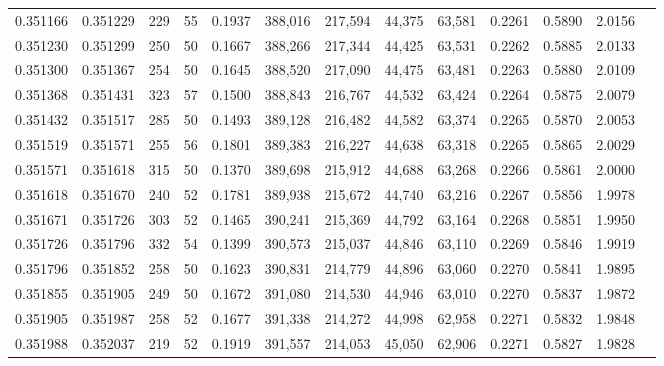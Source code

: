 \begin{tabular}{rrrrrrrrrrrrr}
0.351166 & 0.351229 &   229 &  55 &                                     0.1937 & 388,016 & 217,594 &  44,375 &  63,581 & 0.2261 & 0.5890 & 2.0156 \\
0.351230 & 0.351299 &   250 &  50 &                                     0.1667 & 388,266 & 217,344 &  44,425 &  63,531 & 0.2262 & 0.5885 & 2.0133 \\
0.351300 & 0.351367 &   254 &  50 &                                     0.1645 & 388,520 & 217,090 &  44,475 &  63,481 & 0.2263 & 0.5880 & 2.0109 \\
0.351368 & 0.351431 &   323 &  57 &                                     0.1500 & 388,843 & 216,767 &  44,532 &  63,424 & 0.2264 & 0.5875 & 2.0079 \\
0.351432 & 0.351517 &   285 &  50 &                                     0.1493 & 389,128 & 216,482 &  44,582 &  63,374 & 0.2265 & 0.5870 & 2.0053 \\
0.351519 & 0.351571 &   255 &  56 &                                     0.1801 & 389,383 & 216,227 &  44,638 &  63,318 & 0.2265 & 0.5865 & 2.0029 \\
0.351571 & 0.351618 &   315 &  50 &                                     0.1370 & 389,698 & 215,912 &  44,688 &  63,268 & 0.2266 & 0.5861 & 2.0000 \\
0.351618 & 0.351670 &   240 &  52 &                                     0.1781 & 389,938 & 215,672 &  44,740 &  63,216 & 0.2267 & 0.5856 & 1.9978 \\
0.351671 & 0.351726 &   303 &  52 &                                     0.1465 & 390,241 & 215,369 &  44,792 &  63,164 & 0.2268 & 0.5851 & 1.9950 \\
0.351726 & 0.351796 &   332 &  54 &                                     0.1399 & 390,573 & 215,037 &  44,846 &  63,110 & 0.2269 & 0.5846 & 1.9919 \\
0.351796 & 0.351852 &   258 &  50 &                                     0.1623 & 390,831 & 214,779 &  44,896 &  63,060 & 0.2270 & 0.5841 & 1.9895 \\
0.351855 & 0.351905 &   249 &  50 &                                     0.1672 & 391,080 & 214,530 &  44,946 &  63,010 & 0.2270 & 0.5837 & 1.9872 \\
0.351905 & 0.351987 &   258 &  52 &                                     0.1677 & 391,338 & 214,272 &  44,998 &  62,958 & 0.2271 & 0.5832 & 1.9848 \\
0.351988 & 0.352037 &   219 &  52 &                                     0.1919 & 391,557 & 214,053 &  45,050 &  62,906 & 0.2271 & 0.5827 & 1.9828 \\

\end{tabular}
